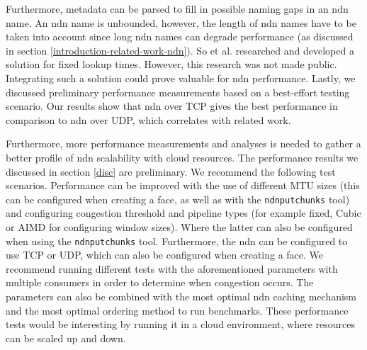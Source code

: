 Furthermore, metadata can be parsed to fill in possible naming gaps in an \gls{ndn} name. An \gls{ndn} name is unbounded, however, the length of \gls{ndn} names have to be taken into account since long \gls{ndn} names can degrade performance (as discussed in section \ref{introduction-related-work-ndn}). So et al. researched and developed a solution for fixed lookup times. However, this research was not made public. Integrating such a solution could prove valuable for \gls{ndn} performance. Lastly, we discussed preliminary performance measurements based on a best-effort testing scenario. Our results show that \gls{ndn} over TCP gives the best performance in comparison to \gls{ndn} over UDP, which correlates with related work.

Furthermore, more performance measurements and analyses is needed to gather a better profile of \gls{ndn} scalability with cloud resources. The performance results we discussed in section \ref{disc} are preliminary. We recommend the following test scenarios. Performance can be improved with the use of different MTU sizes (this can be configured when creating a face, as well as with the \texttt{ndnputchunks} tool) and configuring congestion threshold and pipeline types (for example fixed, Cubic or AIMD for configuring window sizes). Where the latter can also be configured when using the \texttt{ndnputchunks} tool. Furthermore, the \gls{ndn} can be configured to use TCP or UDP, which can also be configured when creating a face. We recommend running different tests with the aforementioned parameters with multiple consumers in order to determine when congestion occurs. The parameters can also be combined with the most optimal \gls{ndn} caching mechanism and the most optimal ordering method \cite{koulouzis2018information} to run benchmarks. These performance tests would be interesting by running it in a cloud environment, where resources can be scaled up and down.


